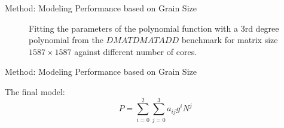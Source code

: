 \documentclass[10pt]{beamer}
\begin{document}
\begin{frame}{Method: Modeling Performance based on Grain Size}
\begin{outline}
\begin{figure}[H]
			\caption{Fitting the parameters of the polynomial function with a $3$rd degree polynomial from the $DMATDMATADD$ benchmark for matrix size $1587\times1587$ against different number of cores.}	
			\label{fig15}
		\end{figure}
	\end{outline}
\end{frame}

\begin{frame}{Method: Modeling Performance based on Grain Size}
	\begin{outline}
		The final model: $$P=\sum_{i=0}^{2} \sum_{j=0}^{3}a_{ij}g^iN^j$$
	\begin{figure}[H]
		\centering
		\hfill

\end{figure}
\end{outline}
\end{frame}
\end{document}
